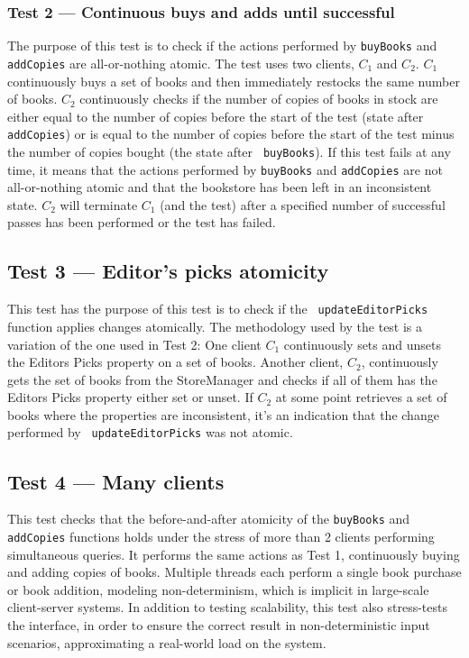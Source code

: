 \documentclass[11pt,a4paper,english]{article}
\begin{document}
\subsubsection{Test 2 --- Continuous buys and adds until successful}
The purpose of this test is to check if the actions performed by {\tt buyBooks}
and {\tt addCopies} are all-or-nothing atomic. The test uses two clients, $C_1$
and $C_2$. $C_1$ continuously buys a set of books and then immediately restocks
the same number of books. $C_2$ continuously checks if the number of copies of
books in stock are either equal to the number of copies before the start of the
test (state after {\tt addCopies}) or is equal to the number of copies before
the start of the test minus the number of copies bought (the state after {\tt
  buyBooks}). If this test fails at any time, it means that the actions
performed by {\tt buyBooks} and {\tt addCopies} are not all-or-nothing atomic
and that the bookstore has been left in an inconsistent state. $C_2$ will
terminate $C_1$ (and the test) after a specified number of successful passes has
been performed or the test has failed.

\subsection{Test 3 --- Editor's picks atomicity}
This test has the purpose of this test is to check if the {\tt
  updateEditorPicks} function applies changes atomically. The methodology used
by the test is a variation of the one used in Test 2: One client $C_1$
continuously sets and unsets the Editors Picks property on a set of
books. Another client, $C_2$, continuously gets the set of books from the
StoreManager and checks if all of them has the Editors Picks property either set
or unset. If $C_2$ at some point retrieves a set of books where the properties
are inconsistent, it's an indication that the change performed by {\tt
  updateEditorPicks} was not atomic.

\subsection{Test 4 --- Many clients}
This test checks that the before-and-after atomicity of the {\tt buyBooks} and
{\tt addCopies} functions holds under the stress of more than 2 clients
performing simultaneous queries. It performs the same actions as Test 1,
continuously buying and adding copies of books. Multiple threads each perform a
single book purchase or book addition, modeling non-determinism, which is
implicit in large-scale client-server systems. In addition to testing
scalability, this test also stress-tests the interface, in order to ensure
the correct result in non-deterministic input scenarios, approximating a
real-world load on the system.
\end{document}
